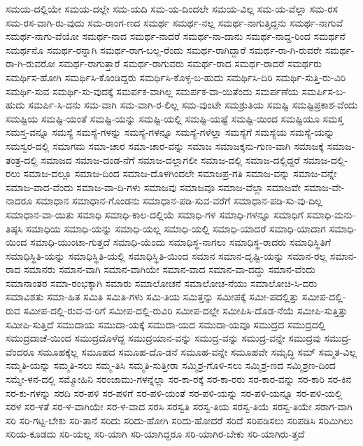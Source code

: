 {ಸಮಯ-ದಲ್ಲಿಯೇ
ಸಮಯ-ದಲ್ಲೇ
ಸಮ-ಯದಿ
ಸಮ-ಯ-ದಿಂದಲೇ
ಸಮಯ-ವಿಲ್ಲ
ಸಮ-ಯ-ವೆಲ್ಲಾ
ಸಮ-ರಸ
ಸಮ-ರಸ-ವಾಗಿ-ರು-ವುದು
ಸಮ-ರಾಂಗ-ಣದ
ಸಮರ್ಥ
ಸಮರ್ಥ-ನಲ್ಲ
ಸಮರ್ಥ-ನಾಗುತ್ತಿದ್ದನು
ಸಮರ್ಥ-ನಾಗುವೆ
ಸಮರ್ಥ-ನಾಗು-ವೆಯೋ
ಸಮರ್ಥ-ನಾದ
ಸಮರ್ಥ-ನಾದರೆ
ಸಮರ್ಥ-ನಾ-ದಾನು
ಸಮರ್ಥ-ನಾದ್ದ-ರಿಂದ
ಸಮರ್ಥನೆ
ಸಮರ್ಥನೊ
ಸಮರ್ಥ-ರನ್ನಾಗಿ
ಸಮರ್ಥ-ರಾಗ-ಬಲ್ಲ-ರೆಂದು
ಸಮರ್ಥ-ರಾಗಿದ್ದಾರೆ
ಸಮರ್ಥ-ರಾ-ಗಿ-ರುವರೇ
ಸಮರ್ಥ-ರಾ-ಗಿ-ರುವರೋ
ಸಮರ್ಥ-ರಾಗುತ್ತಾರೆ
ಸಮರ್ಥ-ರಾಗುವರು
ಸಮರ್ಥ-ರಾದ
ಸಮರ್ಥ-ರಾದರೆ
ಸಮರ್ಥರು
ಸಮರ್ಥಿಸ-ಹೋಗಿ
ಸಮರ್ಥಿಸಿ-ಕೊಂಡಿದ್ದರು
ಸಮರ್ಥಿಸಿ-ಕೊಳ್ಳ-ಬ-ಹುದು
ಸಮರ್ಥಿಸಿ-ದಿರಿ
ಸಮರ್ಥಿ-ಸುತ್ತಿ-ರು-ವಿರಿ
ಸಮರ್ಥಿ-ಸುವ
ಸಮರ್ಥಿ-ಸು-ವುದಕ್ಕೆ
ಸಮರ್ಪಕ-ವಾಗಿಲ್ಲ
ಸಮರ್ಪಕ-ವಾ-ಯಿತೆಂದು
ಸಮರ್ಪಣೆಯ
ಸಮರ್ಪಿಸ-ಬ-ಹುದು
ಸಮರ್ಪಿ-ಸಿ-ದನು
ಸಮ-ವಾಗಿ
ಸಮ-ವಾಗಿ-ರ-ಲಿಲ್ಲ
ಸಮ-ವುಂಟೇ
ಸಮಶ್ರುತಿಯ
ಸಮಷ್ಟಿ
ಸಮಷ್ಟಿಪ್ರಕಾಶ-ವೆಂದು
ಸಮಷ್ಟಿಯ
ಸಮಷ್ಟಿ-ಯಂತೆ
ಸಮಷ್ಟಿ-ಯನ್ನು
ಸಮಷ್ಟಿ-ಯಲ್ಲಿ
ಸಮಷ್ಟಿ-ಯಷ್ಟೆ
ಸಮಷ್ಟಿ-ಯಿಂದ
ಸಮಷ್ಟಿಯೂ
ಸಮಸ್ತ
ಸಮಸ್ತ-ವನ್ನೂ
ಸಮಸ್ಯೆ
ಸಮಸ್ಯೆ-ಗಳನ್ನು
ಸಮಸ್ಯೆ-ಗಳನ್ನೂ
ಸಮಸ್ಯೆ-ಗಳೆಲ್ಲಾ
ಸಮಸ್ಯೆಗೆ
ಸಮಸ್ಯೆಯ
ಸಮಸ್ಯೆ-ಯನ್ನು
ಸಮಸ್ವರ-ದಲ್ಲಿ
ಸಮಾಗಮ
ಸಮಾ-ಚಾರ
ಸಮಾ-ಚಾರ-ವನ್ನು
ಸಮಾಜ
ಸಮಾಜಕ್ಕನು-ಗುಣ-ವಾಗಿ
ಸಮಾಜಕ್ಕೆ
ಸಮಾಜ-ತಂತ್ರ-ದಲ್ಲಿ
ಸಮಾಜದ
ಸಮಾಜ-ದಂಡ-ನೆಗೆ
ಸಮಾಜ-ದಲ್ಲಾಗಲೀ
ಸಮಾಜ-ದಲ್ಲಿ
ಸಮಾಜ-ದಲ್ಲಿದ್ದರೆ
ಸಮಾಜ-ದಲ್ಲಿ-ರಲು
ಸಮಾಜ-ದಲ್ಲೂ
ಸಮಾಜ-ದಿಂದ
ಸಮಾಜ-ದೊಳಗಿಂದಲೇ
ಸಮಾಜಪ್ರ-ಗತಿ
ಸಮಾಜ-ವನ್ನು
ಸಮಾಜ-ವನ್ನೇ
ಸಮಾಜ-ವಾದ-ವೆಂದು
ಸಮಾಜ-ವಾ-ದಿ-ಗಳು
ಸಮಾಜವು
ಸಮಾಜವೂ
ಸಮಾಜ-ವೆಲ್ಲಾ
ಸಮಾಜವೇ
ಸಮಾಜ-ವೇ-ನಾದರೂ
ಸಮಾಧಾನ
ಸಮಾಧಾನ-ಗೊಂಡನು
ಸಮಾಧಾನ-ಪಡಿ-ಸುವ-ವರೆಗೆ
ಸಮಾಧಾನ-ಪಡಿ-ಸು-ವು-ದಿಲ್ಲ
ಸಮಾಧಾನ-ವಾ-ಯಿತು
ಸಮಾಧಿ
ಸಮಾಧಿ-ಕಾಲ-ದಲ್ಲಿಯೆ
ಸಮಾಧಿ-ಗಳ
ಸಮಾಧಿ-ಗಳನ್ನೂ
ಸಮಾಧಿಗೆ
ಸಮಾಧಿ-ಮನು-ತಿಷ್ಠಸಿ
ಸಮಾಧಿಯ
ಸಮಾಧಿ-ಯನ್ನು
ಸಮಾಧಿ-ಯಲ್ಲ
ಸಮಾಧಿ-ಯಲ್ಲಿ
ಸಮಾಧಿ-ಯಾದರೆ
ಸಮಾಧಿ-ಯಾದಾಗ
ಸಮಾಧಿ-ಯಿಂದ
ಸಮಾಧಿ-ಯುಂಟಾ-ಗುತ್ತದೆ
ಸಮಾಧಿ-ಯೆಂದು
ಸಮಾಧಿಸ್ಥ-ನಾಗಲು
ಸಮಾಧಿಸ್ಥ-ರಾದರು
ಸಮಾಧಿಸ್ಥಿತಿಗೆ
ಸಮಾಧಿಸ್ಥಿತಿ-ಯನ್ನು
ಸಮಾಧಿಸ್ಥಿತಿ-ಯಲ್ಲಿ
ಸಮಾಧಿಸ್ಥಿತಿ-ಯಿಂದ
ಸಮಾನ
ಸಮಾನ-ದೃಷ್ಟಿ-ಯನ್ನು
ಸಮಾನ-ರಲ್ಲ
ಸಮಾನ-ರಾದ
ಸಮಾನರು
ಸಮಾನ-ವಾಗಿ
ಸಮಾನ-ವಾಗಿಯೇ
ಸಮಾನ-ವಾದ
ಸಮಾನ-ವಾ-ದದ್ದು
ಸಮಾನ-ವೆಂದು
ಸಮಾನಾಂತರ
ಸಮಾ-ರಂಭಕ್ಕಾಗಿ
ಸಮಾರು
ಸಮಾಲೋಚನೆ
ಸಮಾಲೋಚ-ನೆಯು
ಸಮಾಲೋಚಿ-ಸಿ-ದರು
ಸಮಾವಿಶತು
ಸಮಾ-ಹಿತ
ಸಮಿತಿ
ಸಮಿತಿ-ಗಳು
ಸಮಿ-ತಿಯ
ಸಮಿತ್ತನ್ನು
ಸಮೀಪಕ್ಕೆ
ಸಮೀ-ಪದಲ್ಲಿತ್ತು
ಸಮೀಪ-ದಲ್ಲಿ-ರುವ
ಸಮೀಪ-ದಲ್ಲಿ-ರುವ-ವ-ರಿಗೆ
ಸಮೀಪ-ದಲ್ಲಿ-ರುವಿರಿ
ಸಮೀಪ-ದಲ್ಲೇ
ಸಮೀಪಿಸಿ-ದೊಡ-ನೆಯೆ
ಸಮೀಪಿ-ಸುತ್ತಿತ್ತು
ಸಮೀಪಿ-ಸುತ್ತಿದೆ
ಸಮುದಾಯ
ಸಮುದಾ-ಯಕ್ಕೆ
ಸಮುದಾ-ಯದ
ಸಮುದಾ-ಯವೂ
ಸಮುದ್ರದ
ಸಮುದ್ರದಲ್ಲಿ
ಸಮುದ್ರದಾಚೆ-ಯಿಂದ
ಸಮುದ್ರದೊಳೆದ್ದ
ಸಮುದ್ರಯಾನ-ವನ್ನು
ಸಮುದ್ರ-ವನ್ನು
ಸಮುದ್ರ-ವನ್ನೇ
ಸಮುದ್ರವು
ಸಮುದ್ರ-ವೆಂದರೂ
ಸಮೂಹಕ್ಕೆಲ್ಲ
ಸಮೂಹದ
ಸಮೂಹ-ದೊ-ಡನೆ
ಸಮೂಹ-ವನ್ನೇ
ಸಮೂಹವೇ
ಸಮೃದ್ಧಿ
ಸಮ್
ಸಮ್ಮತ-ವಿಲ್ಲ
ಸಮ್ಮತಿ-ಯನ್ನು
ಸಮ್ಮತಿ-ಸಲು
ಸಮ್ಮ-ತಿಸಿ
ಸಮ್ಮತಿ-ಸುತ್ತೀರಾ
ಸಮ್ಮಿಶ್ರ-ಗೊಳಿ-ಸಲು
ಸಮ್ಮಿಶ್ರ-ಣದ
ಸಮ್ಮಿಶ್ರಣ-ದಿಂದ
ಸಮ್ಮೇ-ಳನ-ದಲ್ಲಿ
ಸಮ್ಮೋಹಿನಿ
ಸರಂಜಾಮು-ಗಳನ್ನೆಲ್ಲಾ
ಸರ-ಕಾ-ರಕ್ಕೆ
ಸರ-ಕಾ-ರರು
ಸರ-ಕಾರ-ವನ್ನು
ಸರ-ಕಾರಿ
ಸರ-ಕಿನ
ಸರ-ಕು-ಗಳನ್ನು
ಸರದಿ
ಸರ-ಪಳಿ
ಸರ-ಪಳಿಗೆ
ಸರ-ಪಳಿ-ಯಂತೆ
ಸರ-ಪಳಿ-ಯನ್ನು
ಸರ-ಪಳಿ-ಯನ್ನೂ
ಸರ-ಪಳಿ-ಯಲ್ಲಿ
ಸರಳ
ಸರ-ಳತೆ
ಸರ-ಳ-ವಾಗಿಯೇ
ಸರ-ಳ-ವಾದ
ಸರಸಿ
ಸರಸ್ವತಿ
ಸರಸ್ವ-ತಿಯ
ಸರಸ್ವ-ತಿಯೆ
ಸರಸ್ವ-ತಿಯೇ
ಸರಾಗ-ವಾಗಿ
ಸರಿ
ಸರಿ-ಗಟ್ಟ-ಬೇಕು
ಸರಿ-ತಾನೆ
ಸರಿದು
ಸರಿದು-ಹೋಗಿ
ಸರಿದು-ಹೋದರೆ
ಸರಿದೆ
ಸರಿಪಡಿಸಲು
ಸರಿಪಡಿಸಿ
ಸರಿಮಿಗಿಲು
ಸರಿಯ-ಕೂಡದು
ಸರಿ-ಯಲ್ಲ
ಸರಿ-ಯಾಗಿ
ಸರಿ-ಯಾಗಿದ್ದರೂ
ಸರಿ-ಯಾಗಿರ-ಬೇಕು
ಸರಿ-ಯಾಗಿರು-ತ್ತದೆ
}

